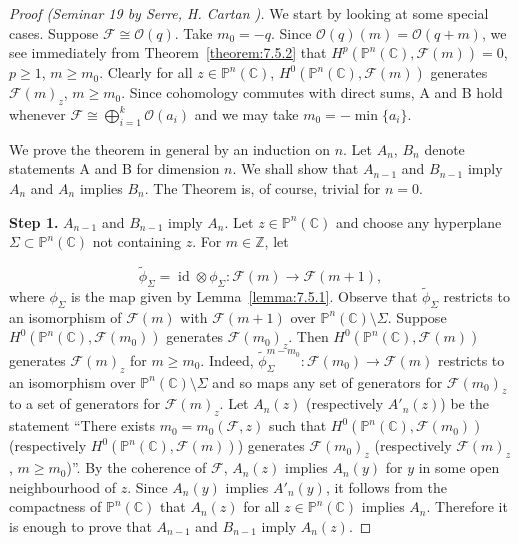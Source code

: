 \begin{proof}[Proof (Seminar 19 by Serre, H. Cartan \cite{bib:II:cartan-h:2})]
We start by looking at some special cases. Suppose $\mathcal F\cong\mathcal O(q)$. Take $m_0=-q$. Since $\mathcal O(q)(m)=\mathcal O(q+m)$, we see immediately from Theorem~\ref{theorem:7.5.2} that $H^p(\mathbb P^n(\mathbb C),\mathcal F(m))=0$, $p\geq1$, $m\geq m_0$. Clearly for all $z\in\mathbb P^n(\mathbb C)$, $H^0(\mathbb P^n(\mathbb C),\mathcal F(m))$ generates $\mathcal F(m)_z$, $m\geq m_0$. Since cohomology commutes with direct sums, A and B hold whenever $\mathcal F\cong\bigoplus_{i=1}^k\mathcal O(a_i)$ and we may take $m_0=-\min\{a_i\}$.

We prove the theorem in general by an induction on $n$. Let $A_n$, $B_n$ denote statements A and B for dimension $n$. We shall show that $A_{n-1}$ and $B_{n-1}$ imply $A_n$ and $A_n$ implies $B_n$. The Theorem is, of course, trivial for $n=0$.

\textbf{Step 1.} $A_{n-1}$ and $B_{n-1}$ imply $A_n$. Let $z\in\mathbb P^n(\mathbb C)$ and choose any hyperplane $\Sigma\subset\mathbb P^n(\mathbb C)$ not containing $z$. For $m\in\mathbb Z$, let

\[
\widetilde\phi_\Sigma=\operatorname{id}\otimes\phi_\Sigma:\mathcal{F}(m)\longrightarrow\mathcal{F}(m+1),
\]
where $\phi_\Sigma$ is the map given by Lemma~\ref{lemma:7.5.1}. Observe that $\widetilde\phi_\Sigma$ restricts to an isomorphism of $\mathcal{F}(m)$ with $\mathcal{F}(m+1)$ over $\mathbb{P}^n(\mathbb{C})\setminus\Sigma$. Suppose $H^0(\mathbb{P}^n(\mathbb{C}),\mathcal{F}(m_0))$ generates $\mathcal{F}(m_0)_z$. Then $H^0(\mathbb{P}^n(\mathbb{C}),\mathcal{F}(m))$ generates $\mathcal{F}(m)_z$ for $m\geq m_0$. Indeed, $\widetilde\phi_\Sigma^{m-m_0}:\mathcal{F}(m_0)\to\mathcal{F}(m)$ restricts to an isomorphism over $\mathbb{P}^n(\mathbb{C})\setminus\Sigma$ and so maps any set of generators for $\mathcal{F}(m_0)_z$ to a set of generators for $\mathcal{F}(m)_z$. Let $A_n(z)$ (respectively $A'_n(z)$) be the statement ``There exists $m_0=m_0(\mathcal{F},z)$ such that $H^0(\mathbb{P}^n(\mathbb{C}),\mathcal{F}(m_0))$ (respectively $H^0(\mathbb{P}^n(\mathbb{C}),\mathcal{F}(m))$) generates $\mathcal{F}(m_0)_z$ (respectively $\mathcal{F}(m)_z$, $m\geq m_0$)''. By the coherence of $\mathcal{F}$, $A_n(z)$ implies $A_n(y)$ for $y$ in some open neighbourhood of $z$. Since $A_n(y)$ implies $A'_n(y)$, it follows from the compactness of $\mathbb{P}^n(\mathbb{C})$ that $A_n(z)$ for all $z\in\mathbb{P}^n(\mathbb{C})$ implies $A_n$. Therefore it is enough to prove that $A_{n-1}$ and $B_{n-1}$ imply $A_n(z)$.


\end{proof}
